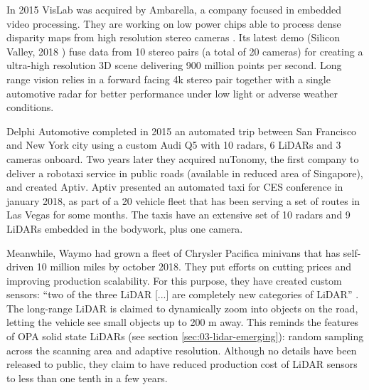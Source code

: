 In 2015 VisLab was acquired by Ambarella, a company focused in embedded video 
processing. They are working on low power chips able to process dense disparity
maps from high resolution stereo cameras \cite{Ambarella2018}. 
Its latest demo (Silicon Valley, 2018 \cite{AUVSI2018}) fuse data from 10 stereo
pairs (a total of 20 cameras) for creating a ultra-high resolution 3D scene 
delivering 900 million points per second.
Long range vision relies in a forward facing 4k stereo pair together with a 
single automotive radar for better performance under low light or adverse 
weather conditions. 

Delphi Automotive completed in 2015 an automated trip between San Francisco and
New York city using a custom Audi Q5 with 10 radars, 6 LiDARs and 3 cameras 
onboard. Two years later they acquired nuTonomy, the first company to deliver a 
robotaxi service in public roads (available in reduced area of Singapore), and
created Aptiv. 
Aptiv presented an automated taxi for CES conference in january 2018, as part
of a 20 vehicle fleet that has been serving a set of routes in Las Vegas for
some months. The taxis have an extensive set of 10 radars and 9 LiDARs embedded 
in the bodywork, plus one camera.

Meanwhile, Waymo had grown a fleet of Chrysler Pacifica minivans that has
self-driven 10 million miles by october 2018. They put efforts on cutting 
prices and improving production scalability. For this purpose, they have created
custom sensors: ``two of the three LiDAR [...] are completely new categories of 
LiDAR'' \cite{Waymoteam2017}. 
The long-range LiDAR is claimed to dynamically zoom into 
objects on the road, letting the vehicle see small objects up to 200 m away. 
This reminds the features of OPA solid state LiDARs (see section
\ref{sec:03-lidar-emerging}): random sampling across the 
scanning area and adaptive resolution. Although no details have been released 
to public, they claim to have reduced production cost of LiDAR sensors to less 
than one tenth in a few years. 

